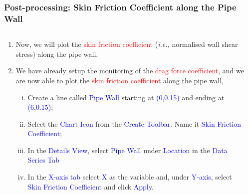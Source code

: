 \documentclass[10pt,compress, unknownkeysallowed]{beamer}
\newcommand{\frc}{\displaystyle\frac}
\newcommand{\red}{\textcolor{red}}
\newcommand{\blue}{\textcolor{blue}}
\newcommand{\ie}{{\it i.e., }}
\begin{document}
\begin{frame}
  \frametitle{Post-processing: Skin Friction Coefficient along the Pipe Wall}
    \begin{columns}
        \begin{column}[l]{0.5\linewidth}
           \begin{enumerate}\scriptsize%
               \item<1-> Now, we will plot the \red{skin friction coefficient} (\ie normalised wall shear stress) along the pipe wall,
                   \visible<1->{\begin{displaymath}
                      c_{f} = \frc{\tau_{w}}{0.5\rho_{\text{ref}}U^{2}_{\text{ref}}}
                   \end{displaymath}}
               \item<2-> We have already setup the monitoring of the \red{drag force coefficient}, and we are now able to plot the \red{skin friction coefficient} along the pipe wall,
                    \begin{enumerate}[i)]\scriptsize
                       \item<2-> Create a line called \blue{Pipe Wall} starting at \blue{(0,0.15)} and ending at \blue{(6,0.15)};
                       \item<2-> Select the \blue{Chart Icon} from the \blue{Create Toolbar}. Name it \blue{Skin Friction Coefficient};
                       \item<2-> In the \blue{Details View}, select \blue{Pipe Wall} under \blue{Location} in the \blue{Data Series Tab}
                       \item<2-> In the \blue{X-axis tab} select \blue{X} as the variable and, under \blue{Y-axis}, select \blue{Skin Friction Coefficient} and click \blue{Apply}.
                    \end{enumerate}
           \end{enumerate}
        \end{column}
           \begin{column}[l]{0.5\linewidth}
\end{column}
\end{columns}
\end{frame}
\end{document}
